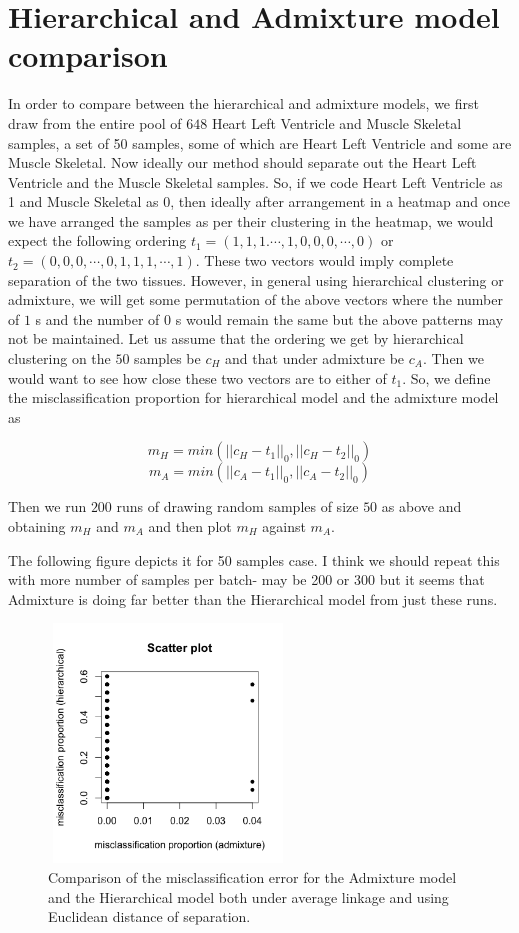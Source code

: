 \documentclass[11pt]{article}
\begin{document}
\section{Hierarchical and Admixture model comparison}

In order to compare between the hierarchical and admixture models, we first draw from the entire pool of $648$ Heart Left Ventricle and Muscle Skeletal samples, a  set of 50 samples, some of which are Heart Left Ventricle and some are Muscle Skeletal. Now ideally our method should separate out the Heart Left Ventricle and the Muscle Skeletal samples. So, if we code Heart Left Ventricle as 1 and Muscle Skeletal as 0, then ideally after arrangement in a heatmap and once we have arranged the samples as per their clustering in the heatmap, we would expect the following ordering $t_1 =(1,1,1.\cdots, 1, 0,0,0, \cdots, 0)$ or $t_2 = (0,0,0, \cdots, 0, 1,1,1, \cdots,1)$. These two vectors would imply complete separation of the two tissues. However, in general using hierarchical clustering or admixture, we will get some permutation of the above vectors where the number of $1$ s and the number of $0$ s would remain the same but the above patterns may not be maintained. Let us assume that the ordering we get by hierarchical clustering on the $50$ samples be $c_{H}$ and that under admixture be $c_{A}$. Then we would want to see how close these two vectors are to either of $t_1$. So, we define the misclassification proportion for hierarchical model and the admixture model as 

$$ m_H = min \left( ||c_{H} - t_{1} ||_{0}, ||c_{H} - t_{2} ||_{0}  \right )  $$
$$ m_A = min \left( ||c_{A} - t_{1} ||_{0}, ||c_{A} - t_{2} ||_{0}  \right )  $$

Then we run $200$ runs of drawing random samples of size $50$ as above and obtaining $m_H$ and $m_A$ and then plot $m_H$ against $m_A$. 

The following figure depicts it for 50 samples case. I think we should repeat this with more number of samples per batch- may be 200 or 300 but it seems that Admixture is doing far better than the Hierarchical model from just these runs.

\begin{figure}[ht]
	\centering
	\includegraphics[height=2.5in, width=2.5in]{../plots/misclass_compare_admixture_hierarchy.png}
        \caption{Comparison of the misclassification error for the Admixture model and the Hierarchical model both under average linkage and using Euclidean distance of separation.}
\end{figure}
\end{document}

